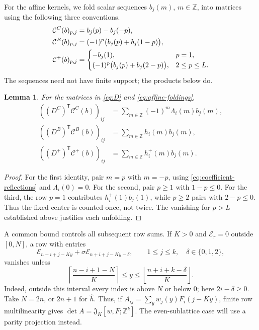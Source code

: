\documentclass[12pt]{article}
\newtheorem{lemma}[theorem]{Lemma}
\numberwithin{equation}{section}
\newcommand{\Z}{\mathbb Z}
\newcommand{\Jaff}{\mathfrak J}
\begin{document}
For the affine kernels, we fold scalar sequences $b_j(m)$, $m\in\Z$,
into matrices using the following three conventions.
\begin{align}
 \mathcal C^C(b)_{p,j}&=b_j(p)-b_j(-p),\notag\\
 \mathcal C^B(b)_{p,j}&=(-1)^p\bigl(b_j(p)+b_j(1-p)\bigr),
 \label{eq:affine-foldings}\\
 \mathcal C^+(b)_{p,j}&=
 \begin{cases}
 -b_j(1),&p=1,\\
 (-1)^p\bigl(b_j(p)+b_j(2-p)\bigr),&2\le p\le L.
 \end{cases}\notag
\end{align}
The sequences need not have finite support; the products below do.

\begin{lemma}
For the matrices in \eqref{eq:D} and \eqref{eq:affine-foldings},
\begin{align}
 ((D^C)^{\mathsf T}\mathcal C^C(b))_{ij}
 &=\sum_{m\in\Z}(-1)^m\Lambda_i(m)b_j(m),\label{eq:pairing-C}\\
 ((D^B)^{\mathsf T}\mathcal C^B(b))_{ij}
 &=\sum_{m\in\Z}h_i(m)b_j(m),\label{eq:pairing-B}\\
 ((D^+)^{\mathsf T}\mathcal C^+(b))_{ij}
 &=\sum_{m\in\Z}h_i^+(m)b_j(m).\label{eq:pairing-plus}
\end{align}
\end{lemma}

\begin{proof}
For the first identity, pair $m=p$ with $m=-p$, using
\eqref{eq:coefficient-reflections} and $\Lambda_i(0)=0$.
For the second, pair $p\ge1$ with $1-p\le0$.
For the third, the row $p=1$ contributes $h_i^+(1)b_j(1)$, while
$p\ge2$ pairs with $2-p\le0$.  Thus the fixed center is counted
once, not twice.  The vanishing for $p>L$ established above justifies
each unfolding.
\end{proof}

A common bound controls all subsequent row sums.  If $K>0$ and
$\mathcal E_r=0$ outside $[0,N]$, a row with entries
\[
 \mathcal E_{n-i+j-Ky}
       +\sigma\mathcal E_{n+i+j-Ky-\delta},
 \qquad 1\le j\le k,\quad \delta\in\{0,1,2\},
\]
vanishes unless
\[
 \left\lceil\frac{n-i+1-N}{K}\right\rceil
 \le y\le
 \left\lfloor\frac{n+i+k-\delta}{K}\right\rfloor.
\]
Indeed, outside this interval every index is above $N$ or below $0$;
here $2i-\delta\ge0$.  Take $N=2n$, or $2n+1$ for
$\widehat h$.  Thus, if $A_{ij}=\sum_y w_j(y)F_i(j-Ky)$, finite row
multilinearity gives $\det A=\Jaff_K[w,F;\Z^k]$.
The even-sublattice case will use a parity projection instead.
\end{document}

